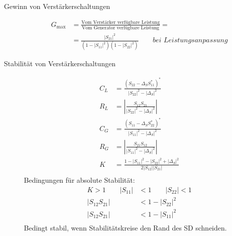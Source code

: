 \begin{description}
\item[Gewinn von Verstärkerschaltungen] 
\begin{align*}
G_\text{max} &= \frac{\text{Vom Verstärker verfügbare Leistung}}{\text{Vom Generator verfügbare Leistung}} = \\
&=  \frac{|S_{21}|^2}{(1-|S_{11}|^2)(1-|S_{22}|^2)} \qquad \textit{bei Leistungsanpassung}
\end{align*}
\item[Stabilität von Verstärkerschaltungen]
\begin{align*}
C_L &= \frac{(S_{22}-\Delta_S S_{11}^*)^*}{|S_{22}|^2 - |\Delta_S|^2} \\
R_L &= \left\vert \frac{S_{12}S_{21}}{|S_{22}|^2 - |\Delta_S|^2} \right\vert \\
C_G &= \frac{(S_{11}-\Delta_S S_{22}^*)^*}{|S_{11}|^2 - |\Delta_S|^2} \\
R_G &= \left\vert \frac{S_{21}S_{12}}{|S_{11}|^2 - |\Delta_S|^2} \right\vert \\
K &= \frac{1 - |S_{11}|^2 - |S_{22}|^2 + |\Delta_S|^2}{2|S_{12}||S_{21}|}\\
\end{align*}
Bedingungen für absolute Stabilität:
\begin{align*}
K > 1 \qquad |S_{11}| &< 1 \qquad |S_{22}| < 1 \\
|S_{12}S_{21}| &< 1-|S_{22}|^2 \\
|S_{12}S_{21}| &< 1-|S_{11}|^2 \\
\end{align*}
Bedingt stabil, wenn Stabilitätskreise den Rand des SD schneiden.


\end{description}
